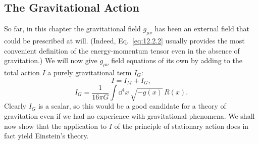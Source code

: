 %

\subsection{The Gravitational Action}\label{sec:12.4}

So far, in this chapter the gravitational field \(g_{\mu\nu}\) has been an
external field that could be prescribed at will. (Indeed,
Eq.~\eqref{eq:12.2.2} usually provides the most convenient definition of the
energy-momentum tensor even in the absence of gravitation.) We will now give
\(g_{\mu\nu}\) field equations of its own by adding to the total action \(I\)
a purely gravitational term \(I_G\):
\begin{equation}
  I=I_M+I_G,
  \tag{12.4.1}\label{eq:12.4.1}
\end{equation}
\begin{equation}
  I_G
  =
  \frac1{16\pi G}\int\dd^4x\,\sqrt{-g(x)}\,R(x).
  \tag{12.4.2}\label{eq:12.4.2}
\end{equation}
Clearly \(I_G\) is a scalar, so this would be a good candidate for a theory
of gravitation even if we had no experience with gravitational phenomena. We
shall now show that the application to \(I\) of the principle of stationary
action does in fact yield Einstein's theory.

